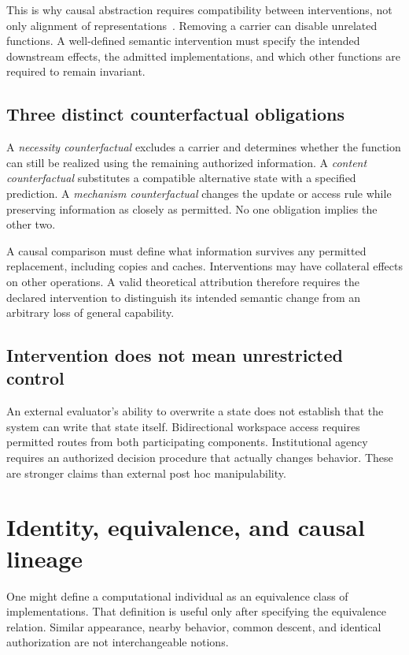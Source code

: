\documentclass[11pt,letterpaper]{article}
\theoremstyle{plain}
\theoremstyle{definition}
\theoremstyle{remark}
\begin{document}
This is why causal abstraction requires compatibility between interventions, not only alignment of representations~\cite{rubenstein,beckers}. Removing a carrier can disable unrelated functions. A well-defined semantic intervention must specify the intended downstream effects, the admitted implementations, and which other functions are required to remain invariant.

\subsection{Three distinct counterfactual obligations}
A \emph{necessity counterfactual} excludes a carrier and determines whether the function can still be realized using the remaining authorized information. A \emph{content counterfactual} substitutes a compatible alternative state with a specified prediction. A \emph{mechanism counterfactual} changes the update or access rule while preserving information as closely as permitted. No one obligation implies the other two.

A causal comparison must define what information survives any permitted replacement, including copies and caches. Interventions may have collateral effects on other operations. A valid theoretical attribution therefore requires the declared intervention to distinguish its intended semantic change from an arbitrary loss of general capability.

\subsection{Intervention does not mean unrestricted control}
An external evaluator's ability to overwrite a state does not establish that the system can write that state itself. Bidirectional workspace access requires permitted routes from both participating components. Institutional agency requires an authorized decision procedure that actually changes behavior. These are stronger claims than external post hoc manipulability.

\section{Identity, equivalence, and causal lineage}\label{sec:identity}
One might define a computational individual as an equivalence class of implementations. That definition is useful only after specifying the equivalence relation. Similar appearance, nearby behavior, common descent, and identical authorization are not interchangeable notions.
\end{document}
